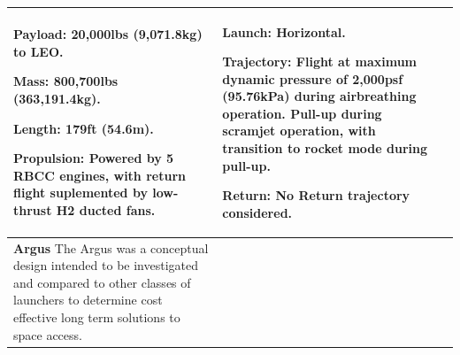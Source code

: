 {\begin{landscape}
\begin{xltabular}{\linewidth}{|X|X|X|}
			\textbf{Payload:} 20,000lbs (9,071.8kg) to LEO. 
			
			\textbf{Mass:} 800,700lbs (363,191.4kg).
			
			\textbf{Length:} 179ft (54.6m). 
			
			
			
			\textbf{Propulsion:} Powered by 5 RBCC engines, with return flight suplemented by low-thrust H2 ducted fans. 
			
			&\small {} 
			
			\textbf{Launch:} Horizontal.
			
			\textbf{Trajectory:} Flight at maximum dynamic pressure of 2,000psf (95.76kPa) during airbreathing operation. Pull-up during scramjet operation, with transition to rocket mode during pull-up. 
			
			\textbf{Return:} No Return trajectory considered.
			
			\\
			\hline \small\textbf{Argus}\cite{Argus} \newline\newline
			The Argus was a conceptual design intended to be investigated and compared to other classes of launchers to determine cost effective long term solutions to space access.  
			&\small
			

\end{xltabular}
\end{landscape}}
